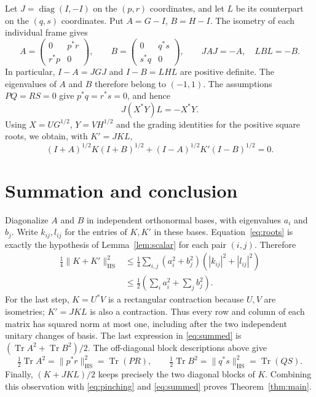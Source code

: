 \documentclass[11pt]{article}
\DeclareMathOperator{\Tr}{Tr}
\newcommand{\HS}{\mathrm{HS}}
\begin{document}
Let $J=\operatorname{diag}(I,-I)$ on the $(p,r)$ coordinates, and let $L$
be its counterpart on the $(q,s)$ coordinates. Put $A=G-I$, $B=H-I$.
The isometry of each individual frame gives
\[
 A=\begin{pmatrix}0&p^*r\\r^*p&0\end{pmatrix},\qquad
 B=\begin{pmatrix}0&q^*s\\s^*q&0\end{pmatrix},
 \qquad JAJ=-A,\quad LBL=-B.
\]
In particular, $I-A=JGJ$ and $I-B=LHL$ are positive definite. The
eigenvalues of $A$ and $B$ therefore belong to $(-1,1)$.
The assumptions $PQ=RS=0$ give $p^*q=r^*s=0$, and hence
\[
 J(X^*Y)L=-X^*Y.
\]
Using $X=UG^{1/2}$, $Y=VH^{1/2}$ and the grading identities for the positive
square roots, we obtain, with $K'=JKL$,
\begin{equation}\label{eq:roots}
 (I+A)^{1/2}K(I+B)^{1/2}
 +(I-A)^{1/2}K'(I-B)^{1/2}=0.
\end{equation}

\section{Summation and conclusion}
Diagonalize $A$ and $B$ in independent orthonormal bases, with eigenvalues
$a_i$ and $b_j$. Write $k_{ij},l_{ij}$ for the entries of $K,K'$ in these
bases. Equation~\eqref{eq:roots} is exactly the hypothesis of
Lemma~\ref{lem:scalar} for each pair $(i,j)$. Therefore
\begin{equation}\label{eq:summed}
\begin{aligned}
 \tfrac14\|K+K'\|_{\HS}^2
 &\leq\tfrac14\sum_{i,j}(a_i^2+b_j^2)
                       (|k_{ij}|^2+|l_{ij}|^2)\\
 &\leq\tfrac12\left(\sum_i a_i^2+\sum_j b_j^2\right).
\end{aligned}
\end{equation}
For the last step, $K=U^*V$ is a rectangular contraction because $U,V$
are isometries; $K'=JKL$ is also a contraction. Thus every row and column
of each matrix has squared norm at most one, including after the two
independent unitary changes of basis. The last expression in
\eqref{eq:summed} is $(\Tr A^2+\Tr B^2)/2$.
The off-diagonal block descriptions above give
\[
 \tfrac12\Tr A^2=\|p^*r\|_{\HS}^2=\Tr(PR),\qquad
 \tfrac12\Tr B^2=\|q^*s\|_{\HS}^2=\Tr(QS).
\]
Finally, $(K+JKL)/2$ keeps precisely the two diagonal blocks of $K$.
Combining this observation with \eqref{eq:pinching} and
\eqref{eq:summed} proves Theorem~\ref{thm:main}.
\end{document}
